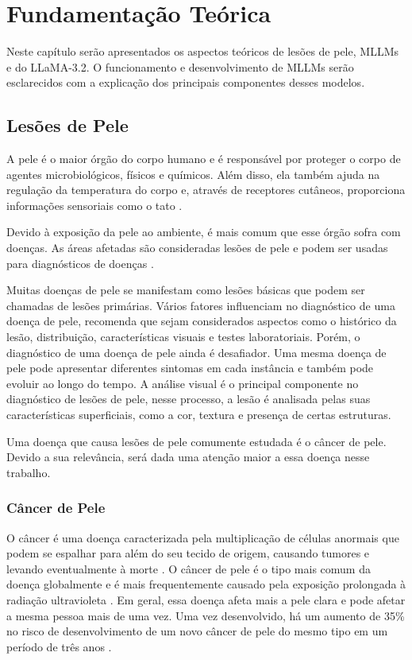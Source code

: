 \chapter{Fundamentação Teórica}

Neste capítulo serão apresentados os aspectos teóricos de lesões de pele, \acp{MLLM} e do \ac{LLaMA}-3.2. O funcionamento e desenvolvimento de \acp{MLLM} serão
esclarecidos com a explicação dos principais componentes desses modelos.

\section{Lesões de Pele}

A pele é o maior órgão do corpo humano e é responsável por proteger o corpo de agentes microbiológicos, físicos e químicos. Além disso, ela também ajuda na regulação da
temperatura do corpo e, através de receptores cutâneos, proporciona informações sensoriais como o tato \cite{skin}.

Devido à exposição da pele ao ambiente, é mais comum que esse órgão sofra com doenças. As áreas afetadas são consideradas lesões de pele e podem ser usadas para
diagnósticos de doenças \cite{segmentation_skin_lesions}.

Muitas doenças de pele se manifestam como lesões básicas que podem ser chamadas de lesões primárias. Vários fatores influenciam no diagnóstico de uma doença de pele,
\textcite{habif2015clinical} recomenda que sejam considerados aspectos como o histórico da lesão, distribuição, características visuais e testes laboratoriais. Porém,
o diagnóstico de uma doença de pele ainda é desafiador. Uma mesma doença de pele pode apresentar diferentes sintomas em cada instância e também pode evoluir ao longo do
tempo. A análise visual é o principal componente no diagnóstico de lesões de pele, nesse processo, a lesão é analisada pelas suas características superficiais, como a
cor, textura e presença de certas estruturas.

Uma doença que causa lesões de pele comumente estudada é o câncer de pele. Devido a sua relevância, será dada uma atenção maior a essa doença nesse trabalho.

\subsection{Câncer de Pele}

O câncer é uma doença caracterizada pela multiplicação de células anormais que podem se espalhar para além do seu tecido de origem, causando tumores e levando
eventualmente à morte \cite{cancer}. O câncer de pele é o tipo mais comum da doença globalmente e é mais frequentemente causado pela exposição prolongada à radiação
ultravioleta \cite{skin_cancer}. Em geral, essa doença afeta mais a pele clara e pode afetar a mesma pessoa mais de uma vez. Uma vez desenvolvido, há um aumento de 35\%
no risco de desenvolvimento de um novo câncer de pele do mesmo tipo em um período de três anos \cite{skin_cancer_zink}.

